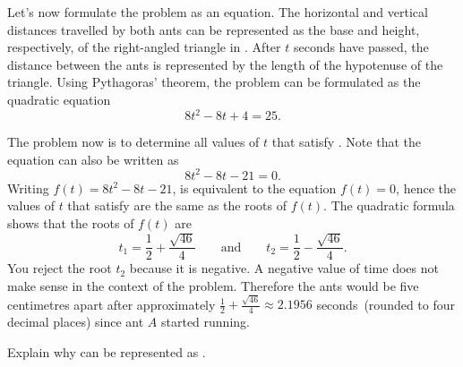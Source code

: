 \documentclass[a4paper,oneside,12pt]{article}
\begin{document}
\begin{solution}
Let's now formulate the problem as an equation.  The horizontal and
vertical distances travelled by both ants can be represented as the
base and height, respectively, of the right-angled triangle in
.  After $t$ seconds have passed,
the distance between the ants is represented by the length of the
hypotenuse of the triangle.  Using Pythagoras' theorem, the problem
can be formulated as the quadratic equation
\begin{equation}
\label{eqn:running_ants_quadratic_equation}
8t^2 - 8t + 4
=
25.
\end{equation}

The problem now is to determine all values of $t$ that satisfy
.  Note that the
equation can also be written as
\[
8t^2 - 8t - 21
=
0.
\]
Writing $f(t) = 8t^2 - 8t - 21$,
 is equivalent to the
equation $f(t) = 0$, hence the values of $t$ that satisfy
 are the same as the
roots of $f(t)$.  The quadratic formula shows that the roots of $f(t)$
are
\begin{equation}
\label{eqn:running_ants_roots}
t_1
=
\frac{1}{2}
+
\frac{\sqrt{46}}{4}
\qquad
\text{and}
\qquad
t_2
=
\frac{1}{2}
-
\frac{\sqrt{46}}{4}.
\end{equation}
You reject the root $t_2$ because it is negative.  A negative value of
time does not make sense in the context of the problem.  Therefore the
ants would be five centimetres apart after approximately
$\frac{1}{2}
+
\frac{\sqrt{46}}{4}
\approx
2.1956$
seconds~(rounded to four decimal places) since ant $A$ started running.
\end{solution}

\begin{exercise}
Explain why  can be represented as
.
\end{exercise}
\end{document}
